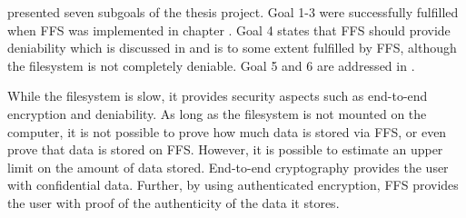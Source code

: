  presented seven subgoals of the thesis project. Goal 1-3 were successfully fulfilled when \gls{FFS} was implemented in chapter . Goal 4 states that \gls{FFS} should provide deniability which is discussed in  and is to some extent fulfilled by \gls{FFS}, although the filesystem is not completely deniable. Goal 5 and 6 are addressed in .

While the filesystem is slow, it provides security aspects such as \mbox{end-to-end} encryption and deniability. As long as the filesystem is not mounted on the computer, it is not possible to prove how much data is stored via \gls{FFS}, or even prove that data is stored on \gls{FFS}. However, it is possible to estimate an upper limit on the amount of data stored. \mbox{End-to-end} cryptography provides the user with confidential data. Further, by using authenticated encryption, \gls{FFS} provides the user with proof of the authenticity of the data it stores. 

